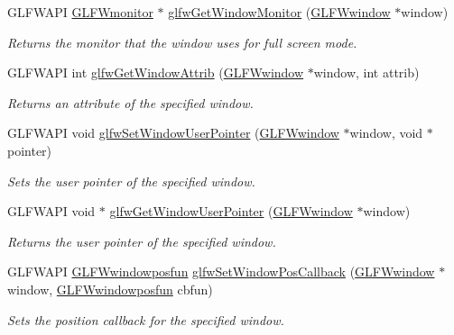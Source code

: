 \begin{DoxyCompactItemize}
\-G\-L\-F\-W\-A\-P\-I \hyperlink{group__monitor_ga8d9efd1cde9426692c73fe40437d0ae3}{\-G\-L\-F\-Wmonitor} $\ast$ \hyperlink{group__window_gaf1525cb3bccd5789c702cc9676ef3403}{glfw\-Get\-Window\-Monitor} (\hyperlink{group__window_ga3c96d80d363e67d13a41b5d1821f3242}{\-G\-L\-F\-Wwindow} $\ast$window)
\begin{DoxyCompactList}\small\item\em \-Returns the monitor that the window uses for full screen mode. \end{DoxyCompactList}\item 
\-G\-L\-F\-W\-A\-P\-I int \hyperlink{group__window_ga1bb0c7e100418e284dbb800789c63d40}{glfw\-Get\-Window\-Attrib} (\hyperlink{group__window_ga3c96d80d363e67d13a41b5d1821f3242}{\-G\-L\-F\-Wwindow} $\ast$window, int attrib)
\begin{DoxyCompactList}\small\item\em \-Returns an attribute of the specified window. \end{DoxyCompactList}\item 
\-G\-L\-F\-W\-A\-P\-I void \hyperlink{group__window_gacc9e68faee3c1763b54cd9bc405cf43e}{glfw\-Set\-Window\-User\-Pointer} (\hyperlink{group__window_ga3c96d80d363e67d13a41b5d1821f3242}{\-G\-L\-F\-Wwindow} $\ast$window, void $\ast$pointer)
\begin{DoxyCompactList}\small\item\em \-Sets the user pointer of the specified window. \end{DoxyCompactList}\item 
\-G\-L\-F\-W\-A\-P\-I void $\ast$ \hyperlink{group__window_ga0a9ff3b4bf8589e9518e8816d06a8f50}{glfw\-Get\-Window\-User\-Pointer} (\hyperlink{group__window_ga3c96d80d363e67d13a41b5d1821f3242}{\-G\-L\-F\-Wwindow} $\ast$window)
\begin{DoxyCompactList}\small\item\em \-Returns the user pointer of the specified window. \end{DoxyCompactList}\item 
\-G\-L\-F\-W\-A\-P\-I \hyperlink{group__window_ga1c36e52549efd47790eb3f324da71924}{\-G\-L\-F\-Wwindowposfun} \hyperlink{group__window_gaea610899c4cb070dcd655c6de1fe1d2c}{glfw\-Set\-Window\-Pos\-Callback} (\hyperlink{group__window_ga3c96d80d363e67d13a41b5d1821f3242}{\-G\-L\-F\-Wwindow} $\ast$window, \hyperlink{group__window_ga1c36e52549efd47790eb3f324da71924}{\-G\-L\-F\-Wwindowposfun} cbfun)
\begin{DoxyCompactList}\small\item\em \-Sets the position callback for the specified window. \end{DoxyCompactList}\item 

\end{DoxyCompactItemize}

